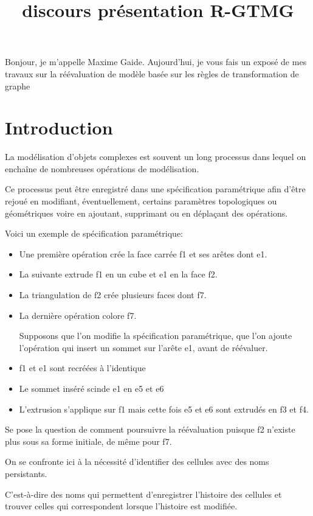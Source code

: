 \documentclass[11pt]{article}
\date{}
\title{discours présentation R-GTMG}
\begin{document}
\maketitle
Bonjour, je m'appelle Maxime Gaide. Aujourd'hui, je vous fais un exposé de mes
travaux sur la réévaluation de modèle basée sur les règles de transformation de
graphe
\section{Introduction}
\label{sec:orgded3f04}

La modélisation d'objets complexes est souvent un long processus dans lequel on
enchaîne de nombreuses opérations de modélisation.

Ce processus peut être enregistré dans une spécification paramétrique afin
d'être rejoué en modifiant, éventuellement, certains paramètres topologiques ou
géométriques voire en ajoutant, supprimant ou en déplaçant des opérations.

Voici un exemple de spécification paramétrique:
\begin{itemize}
\item Une première opération crée la face carrée f1 et ses arêtes dont e1.
\item La suivante extrude f1 en un cube et e1 en la face f2.
\item La triangulation de f2 crée plusieurs faces dont f7.
\item La dernière opération colore f7.

Supposons que l'on modifie la spécification paramétrique, que l'on ajoute
l'opération qui insert un sommet sur l'arête e1, avant de réévaluer.

\item f1 et e1 sont recréées à l'identique
\item Le sommet inséré scinde e1 en e5 et e6
\item L'extrusion s'applique sur f1 mais cette fois e5 et e6 sont extrudés en f3 et
f4.
\end{itemize}

Se pose la question de comment poursuivre la réévaluation puisque f2 n'existe
plus sous sa forme initiale, de même pour f7.

On se confronte ici à la nécessité d'identifier des cellules avec des noms
persistants.

C'est-à-dire des noms qui permettent d'enregistrer l'histoire des cellules et
trouver celles qui correspondent lorsque l'histoire est modifiée.
\end{document}
